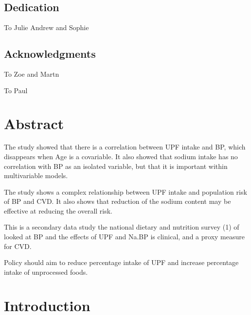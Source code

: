 \documentclass[
]{article}
\begin{document}
\newpage

\hypertarget{dedication}{%
\subsection*{Dedication}\label{dedication}}

To Julie Andrew and Sophie

\newpage

\hypertarget{acknowledgments}{%
\subsection*{Acknowledgments}\label{acknowledgments}}

To Zoe and Martn

To Paul

\newpage

\newpage

\hypertarget{abstract}{%
\section*{Abstract}\label{abstract}}

The study showed that there is a correlation between UPF intake and BP,
which disappears when Age is a covariable. It also showed that sodium
intake has no correlation with BP as an isolated variable, but that it
is important within multivariable models.

The study shows a complex relationship between UPF intake and population
risk of BP and CVD. It also shows that reduction of the sodium content
may be effective at reducing the overall risk.

This is a secondary data study the national dietary and nutrition survey
(1) of looked at BP and the effects of UPF and Na.BP is clinical, and a
proxy measure for CVD.

Policy should aim to reduce percentage intake of UPF and increase
percentage intake of unprocessed foods.

\tableofcontents
\listoffigures
\listoftables
\newpage

\newpage

\hypertarget{introduction}{%
\section{Introduction}\label{introduction}}
\end{document}
